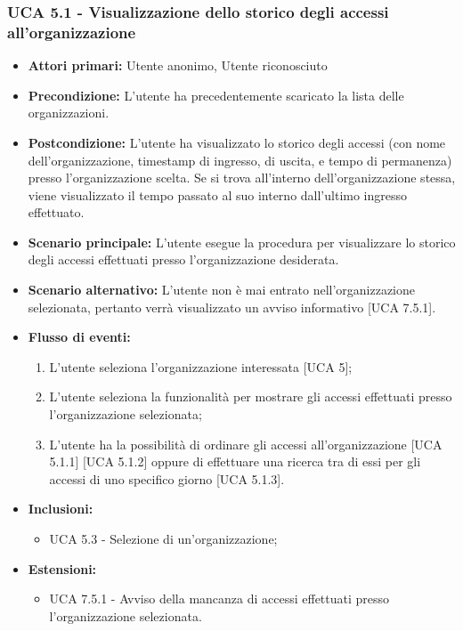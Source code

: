 \subsubsection{UCA 5.1 - Visualizzazione dello storico degli accessi all'organizzazione}
\begin{itemize}
    \item \textbf{Attori primari:} Utente anonimo, Utente riconosciuto
    \item \textbf{Precondizione:} L'utente ha precedentemente scaricato la lista delle organizzazioni.
    \item \textbf{Postcondizione:} L'utente ha visualizzato lo storico degli accessi (con nome dell'organizzazione, timestamp di ingresso, di uscita, e tempo di permanenza) presso l'organizzazione scelta. Se si trova all'interno dell'organizzazione stessa, viene visualizzato il tempo passato al suo interno dall'ultimo ingresso effettuato.
    \item \textbf{Scenario principale:} L'utente esegue la procedura per visualizzare lo storico degli accessi effettuati presso l'organizzazione desiderata.
    \item \textbf{Scenario alternativo:} L'utente non è mai entrato nell'organizzazione selezionata, pertanto verrà visualizzato un avviso informativo [UCA 7.5.1].
    \item \textbf{Flusso di eventi:}
    \begin{enumerate}
        \item L'utente seleziona l'organizzazione interessata [UCA 5];
        \item L'utente seleziona la funzionalità per mostrare gli accessi effettuati presso l'organizzazione selezionata;
        \item L'utente ha la possibilità di ordinare gli accessi all'organizzazione [UCA 5.1.1] [UCA 5.1.2] oppure di effettuare una ricerca tra di essi per gli accessi di uno specifico giorno [UCA 5.1.3].
    \end{enumerate}
    \item \textbf{Inclusioni:}
    \begin{itemize}
        \item UCA 5.3 - Selezione di un'organizzazione;
    \end{itemize}
    \item \textbf{Estensioni:}
    \begin{itemize}
        \item UCA 7.5.1 - Avviso della mancanza di accessi effettuati presso l'organizzazione selezionata.
    \end{itemize}
\end{itemize}


